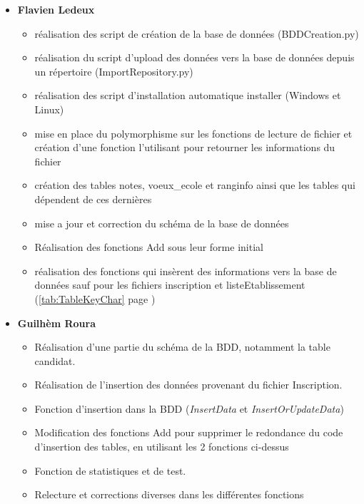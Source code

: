       \begin{itemize}
          \item \textbf{Flavien Ledeux}
          \begin{itemize}[label=$\bullet$]
              \item réalisation des script de création de la base de données (BDDCreation.py)
              \item réalisation du script d'upload des données vers la base de données depuis un répertoire (ImportRepository.py)
              \item réalisation des script d'installation automatique installer (Windows et Linux)
              \item mise en place du polymorphisme sur les fonctions de lecture de fichier et création d'une fonction l'utilisant pour retourner les informations du fichier
              
              \item création des tables notes, voeux\_ecole et ranginfo ainsi que les tables qui dépendent de ces dernières
              \item mise a jour et correction du schéma de la base de données
              
              \item Réalisation des fonctions Add sous leur forme initial
              \item réalisation des fonctions qui insèrent des informations vers la base de données sauf pour les fichiers inscription et listeEtablissement (\ref{tab:TableKeyChar} page \pageref{tab:TableKeyChar})
          \end{itemize}
          
          \item \textbf{Guilhèm Roura}
          \begin{itemize}[label=$\bullet$] 
              \item Réalisation d'une partie du schéma de la BDD, notamment la table candidat.
              \item Réalisation de l'insertion des données provenant du fichier Inscription.
              \item Fonction d'insertion dans la BDD (\textit{InsertData} et \textit{InsertOrUpdateData})
              \item Modification des fonctions Add pour supprimer le redondance du code d'insertion des tables, en utilisant les 2 fonctions ci-dessus
              \item Fonction de statistiques et de test.
              \item Relecture et corrections diverses dans les différentes fonctions
              

\end{itemize}
\end{itemize}
